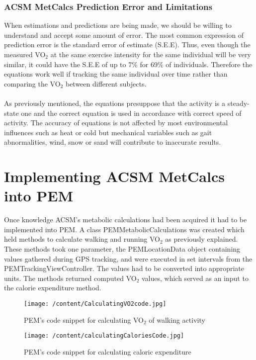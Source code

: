 \documentclass[12pt, a4paper]{report}   %
\begin{document}
\begin{enumerate}
\subsubsection{ACSM MetCalcs Prediction Error and Limitations}
When estimations and predictions are being made, we should be willing to understand and accept some amount of error. The most common expression of prediction error is the standard error of estimate (S.E.E). Thus, even though the measured VO$_{2}$ at the same exercise intensity for the same individual will be very similar, it could have the S.E.E of up to 7\% for 69\% of individuals. Therefore the equations work well if tracking the same individual over time rather than comparing the VO$_{2}$ between different subjects.\\ \\
As previously mentioned, the equations presuppose that the activity is a steady-state one and the correct equation is used in accordance with correct speed of activity.
The accuracy of equations is not affected by most environmental influences such as heat or cold but mechanical variables such as gait abnormalities, wind, snow or sand will contribute to inaccurate results.\\


\clearpage
\section{Implementing ACSM MetCalcs into PEM}
Once knowledge ACSM's metabolic calculations had been acquired it had to be implemented into PEM. A class PEMMetabolicCalculations was created which held methods to calculate walking and running VO$_{2}$ as previously explained. These methods took one parameter, the PEMLocationData object containing values gathered during GPS tracking, and were executed in set intervals from the PEMTrackingViewController. The values had to be converted into appropriate units. The methods returned computed VO$_{2}$ values, which served as an input to the calorie expenditure method.


\begin{figure}[H]
  \centering
	\texttt{[image: /content/CalculatingVO2code.jpg]}
	  \caption{PEM's code snippet for calculating VO$_{2}$ of walking activity}
\end{figure}


\begin{figure}[H]
  \centering
	\texttt{[image: /content/calculatingCaloriesCode.jpg]}
	  \caption{PEM's code snippet for calculating caloric expenditure}
\end{figure}


\end{enumerate}
\end{document}

